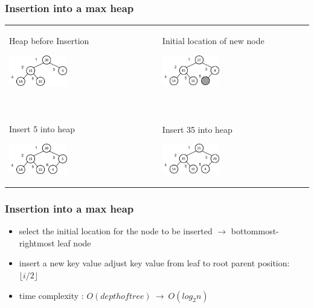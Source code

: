 \documentclass[newPxFont,sthlmFooter,nooffset]{beamer}
\begin{document}
\begin{frame}[t]
  \frametitle{Insertion into a max heap}
  \begin{tabular}{p{} p{}}
Heap before Insertion

    \includegraphics[width=0.4\textwidth]{./figures/fig13_heap_insert.png}
&    
  Initial location of new node

    \includegraphics[width=0.4\textwidth]{./figures/fig13_heap_insert1.png}
\pause \\
~& ~\\
Insert 5 into heap

    \includegraphics[width=0.4\textwidth]{./figures/fig13_heap_insert2.png}
&
Insert 35 into heap

    \includegraphics[width=0.4\textwidth]{./figures/fig13_heap_insert3.png}
\\
  \end{tabular}
\end{frame}


\begin{frame}[t]
  \frametitle{Insertion into a max heap}
  \begin{itemize}
  \item select the initial location for the node to be inserted $\rightarrow$
    bottommost-rightmost leaf node
  \item insert a new key value adjust key
    value from leaf to root parent position: $\lfloor i/2 \rfloor$
  \item time complexity :
    $O(depth of tree) ~\rightarrow~ O(log_2n)$
  \end{itemize}
\end{frame}
\end{document}
